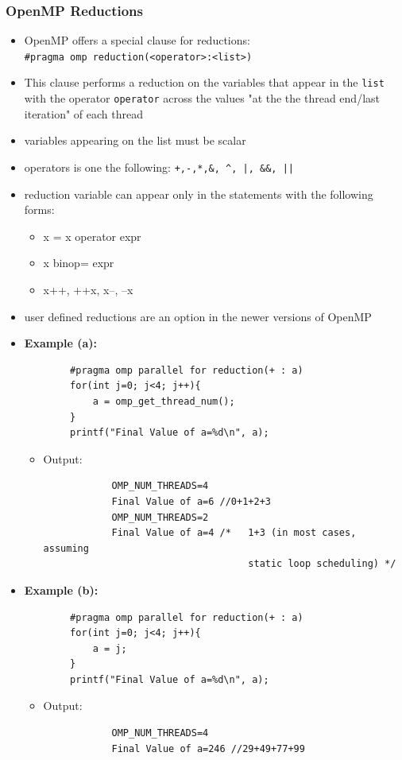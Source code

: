 \documentclass[12pt, a4paper]{report}
\begin{document}
\subsubsection{OpenMP Reductions}
\begin{itemize}
    \item OpenMP offers a special clause for reductions:\\ \verb$#pragma omp reduction(<operator>:<list>)$
    \item This clause performs a reduction on the variables that appear in the \verb$list$ with the operator \verb$operator$ across the values "at the
          the thread end/last iteration" of each thread
    \item variables appearing on the list must be scalar
    \item operators is one the following: \verb$+,-,*,&, ^, |, &&, ||$
    \item reduction variable can appear only in the statements with the following forms:
    \begin{itemize}
        \item x = x operator expr
        \item x binop= expr
        \item x++, ++x, x--, --x
    \end{itemize}
    \item user defined reductions are an option in the newer versions of OpenMP
    \item {\bfseries{Example (a):}}
    \begin{verbatim}
        #pragma omp parallel for reduction(+ : a)
        for(int j=0; j<4; j++){
            a = omp_get_thread_num();
        }
        printf("Final Value of a=%d\n", a);
    \end{verbatim}
    \begin{itemize}
        \item {Output:}
        \begin{verbatim}
            OMP_NUM_THREADS=4
            Final Value of a=6 //0+1+2+3
            OMP_NUM_THREADS=2
            Final Value of a=4 /*   1+3 (in most cases, assuming 
                                    static loop scheduling) */
        \end{verbatim}
    \end{itemize}
    \item {\bfseries{Example (b):}}
    \begin{verbatim}
        #pragma omp parallel for reduction(+ : a)
        for(int j=0; j<4; j++){
            a = j;
        }
        printf("Final Value of a=%d\n", a);
    \end{verbatim}
    \begin{itemize}
        \item {Output:}
        \begin{verbatim}
            OMP_NUM_THREADS=4
            Final Value of a=246 //29+49+77+99


\end{verbatim}
\end{itemize}
\end{itemize}
\end{document}
